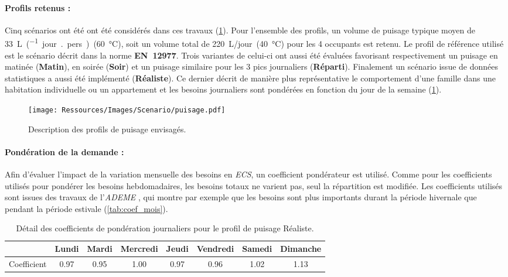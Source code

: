 \paragraph{Profils retenus :} %
\label{par:profils_retenus}
Cinq scénarios ont été ont été considérés dans ces travaux (\ref{fig:profil_puisage}). Pour
l’ensemble des profils, un volume de puisage typique moyen de
\SI{33}{\liter\per(jour {.} pers)}~(\SI{60}{\celsius}), soit un
volume total de \SI{220}{\liter/jour}~(\SI{40}{\celsius}) pour les 4 occupants est
retenu. Le profil de référence utilisé est le scénario décrit dans la norme
\textbf{EN~12977}. Trois variantes de celui-ci ont aussi été évaluées favorisant
respectivement un puisage en matinée (\textbf{Matin}), en soirée (\textbf{Soir}) et un
puisage similaire pour les 3 pics journaliers (\textbf{Réparti}). Finalement un scénario
issue de données statistiques \parencite{ADEME2016} a aussi été implémenté
(\textbf{Réaliste}). Ce dernier décrit de manière plus représentative le comportement
d’une famille dans une habitation individuelle ou un appartement et les besoins
journaliers sont pondérées en fonction du jour de la semaine (\ref{tab:coef_semaine}).
\begin{figure}
    \begin{center}
        \texttt{[image: Ressources/Images/Scenario/puisage.pdf]}
    \end{center}
    \caption{Description des profils de puisage envisagés.
             \label{fig:profil_puisage}}
\end{figure}

\paragraph{Pondération de la demande :} %
\label{par:ponderation_de_la_demande}
Afin d’évaluer l’impact de la variation mensuelle des besoins en \emph{ECS}, un
coefficient pondérateur est utilisé. Comme pour les coefficients utilisés pour pondérer
les besoins hebdomadaires, les besoins totaux ne varient pas, seul la répartition est
modifiée. Les coefficients utilisés sont issues des travaux de l’\textit{ADEME}
\parencite{ADEME2016}, qui montre par exemple que les besoins sont plus importants durant
la période hivernale que pendant la période estivale (\ref{tab:coef_mois}).

\begin{table}
\centering
\begin{tabular}{l*{7}{c}}
    \toprule
                & Lundi & Mardi & Mercredi & Jeudi & Vendredi & Samedi & Dimanche \\
    \midrule
    Coefficient & 0.97  & 0.95  & 1.00     & 0.97  & 0.96     & 1.02   & 1.13     \\
    \bottomrule
\end{tabular}
\caption{Détail des coefficients de pondération journaliers pour le profil de
         puisage Réaliste.}
         \label{tab:coef_semaine}
\end{table}

